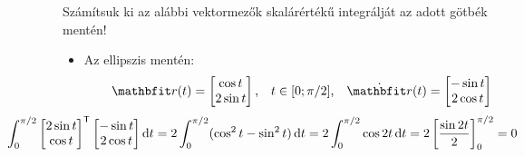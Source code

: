 \documentclass[exercise]{math-standalone}
\begin{document}
\begin{exercise}{Számítsuk ki az alábbi vektormezők skalárértékű integrálját az adott götbék mentén!}
{\begin{enumerate}[a)]
\begin{itemize}[i)]
              \item Az ellipszis mentén:
                    \[
                      \rvec r(t) = \begin{bmatrix}
                        \cos t \\ 2 \sin t
                      \end{bmatrix}
                      \text,\quad
                      t \in [0; \pi/2]
                      \text,\quad
                      \dot{\rvec r}(t) = \begin{bmatrix}
                        - \sin t \\ 2 \cos t
                      \end{bmatrix}
                    \]
                    \[
                      \hspace{-2.2cm}
                      \int_0^{\pi / 2} \begin{bmatrix}
                        2 \sin t \\ \cos t
                      \end{bmatrix}^\transpose
                      \begin{bmatrix}
                        - \sin t \\ 2 \cos t
                      \end{bmatrix}
                      \diff t
                      = 2 \int_0^{\pi / 2} (\cos^2 t - \sin^2 t) \, \diff t
                      = 2 \int_0^{\pi / 2} \cos 2t \, \diff t
                      = 2 \left[ \frac{\sin 2t}{2} \right]_0^{\pi / 2}
                      = 0
                    \]
            \end{itemize}
    \end{enumerate}
  }
\end{exercise}
\end{document}
